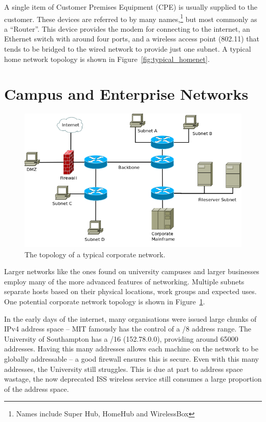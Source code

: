 \documentclass[12pt,a4paper,twoside]{report}
\begin{document}
A single item of Customer Premises Equipment (CPE)  is usually supplied to the customer. These devices are
referred to by many names,\footnote{Names include Super Hub, HomeHub and
WirelessBox} but most commonly as a ``Router''.  This device provides the modem for
connecting to the internet, an Ethernet switch with around four ports, and a
wireless access point (802.11) that tends to be bridged to the wired network to
provide just one subnet. A typical home network topology is shown in
Figure~\ref{fig:typical_homenet}.

\section{Campus and Enterprise Networks}
\begin{figure}
\begin{center}
	\includegraphics[width=\linewidth]{../Diagrams/Network/CorporateNetwork.png}
	\caption{The topology of a typical corporate network.}\label{fig:corporate_net}
\end{center}
\end{figure}
Larger networks like the ones found on university campuses and larger
businesses employ many of the more advanced features of networking.  Multiple
subnets separate hosts based on their physical locations, work groups and
expected uses. One potential corporate network topology is shown in
Figure~\ref{fig:corporate_net}.

In the early days of the internet, many organisations were issued large chunks
of IPv4 address space -- MIT famously has the control of a /8 address
range\cite{IPv4IANA}. The University of Southampton has a /16 (152.78.0.0),
providing around 65000 addresses. Having this many addresses allows each
machine on the network to be globally addressable -- a good firewall ensures
this is secure.  Even with this many addresses, the University still struggles.
This is due at part to address space wastage, the now deprecated ISS wireless
service still consumes a large proportion of the address space.
\end{document}
